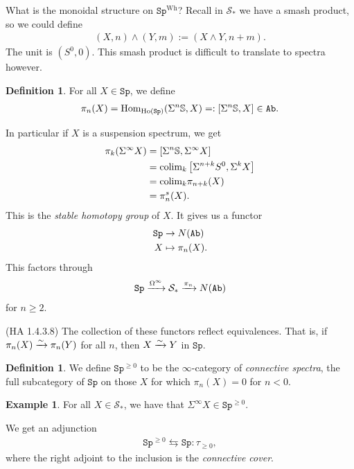 \documentclass[12pt]{amsart}
\theoremstyle{definition}
\newtheorem{definition}[theorem]{Definition}
\newtheorem{example}[theorem]{Example}
\let\smashprod\wedge
\providecommand{\Sp}{\texttt{Sp}}
\providecommand{\Sp}{\text{Sp}}
\begin{document}
What is the monoidal structure on $\Sp^\text{Wh}$? Recall in $\mathcal{S}_\ast$ we have a smash product, so we could define
\begin{align*}
    (X,n) \smashprod (Y,m) := (X \smashprod Y, n+m).
\end{align*}
The unit is $(S^0,0)$. This smash product is difficult to translate to spectra however.

\begin{definition} For all $X\in \Sp$, we define
\begin{align*}
    \pi_n(X) = \Hom_{\Ho(\Sp)}(\Sigma^n \mathbb{S}, X) =: [\Sigma^n \mathbb{S}, X] \in \Ab.
\end{align*}
\end{definition}
In particular if $X$ is a suspension spectrum, we get
\begin{align*}
    \pi_k (\Sigma^\infty X) &= \left[ \Sigma^n \mathbb{S}, \Sigma^\infty X \right] \\
    &= \text{colim}_k \left[ \Sigma^{n+k}S^0, \Sigma^k X \right] \\
    &= \text{colim}_k \pi_{n+k}(X) \\
    &= \pi_n^s(X).
\end{align*}
This is the \textit{stable homotopy group} of $X$. It gives us a functor
\begin{align*}
    \Sp &\to N(\Ab) \\
    X &\mapsto \pi_n(X).
\end{align*}
This factors through
\begin{align*}
    \Sp \xto{\Omega^\infty} \mathcal{S}_\ast \xto{\pi_n} N(\Ab)
\end{align*}
for $n\ge 2$.

(HA 1.4.3.8) The collection of these functors reflect equivalences. That is, if $\pi_n(X) \xrightarrow{\sim} \pi_n(Y)$ for all $n$, then $X\xrightarrow{\sim} Y$ in $\Sp$.

\begin{definition} We define $\Sp^{\ge 0}$ to be the $\infty$-category of \textit{connective spectra}, the full subcategory of $\Sp$ on those $X$ for which $\pi_n(X) = 0$ for $n<0$.
\end{definition}

\begin{example} For all $X\in \mathcal{S}_\ast$, we have that $\Sigma^\infty X \in \Sp^{\ge0}$.
\end{example}

We get an adjunction
\begin{align*}
    \Sp^{\ge0} \leftrightarrows \Sp: \tau_{\ge 0},
\end{align*}
where the right adjoint to the inclusion is the \textit{connective cover}.
\end{document}
